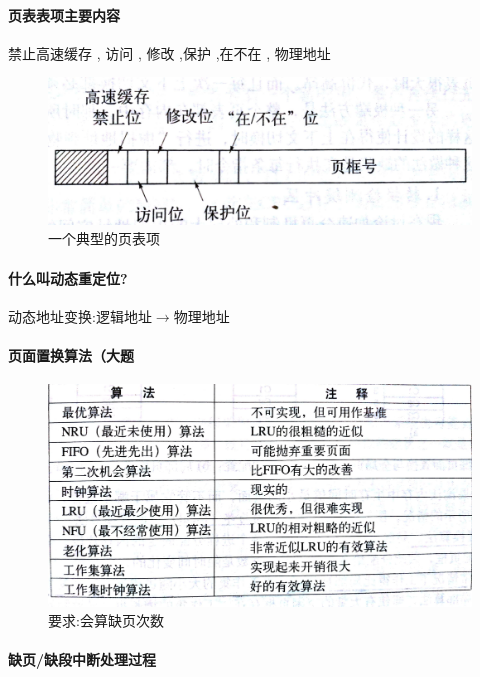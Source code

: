 \documentclass[UTF8,a4paper]{ctexart}
\begin{document}
\paragraph{页表表项主要内容}禁止高速缓存 , 访问 , 修改 ,保护 ,在不在 , 物理地址
\begin{figure}[H]
	\centering
	\includegraphics[scale = 0.1]{assets/ModernOperatingSystems_c9507.png}
	\caption{一个典型的页表项}
\end{figure}

\paragraph{什么叫动态重定位?}动态地址变换:逻辑地址$\to$物理地址

\paragraph{页面置换算法（大题}
\begin{figure}[H]
	\centering
	\includegraphics[scale = 0.1]{assets/ModernOperatingSystems_22227.png}
	\caption{要求:会算缺页次数}
\end{figure}

\paragraph{缺页/缺段中断处理过程}
\end{document}
